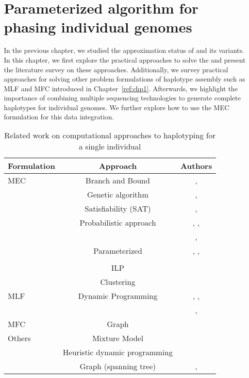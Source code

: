 \chapter{Parameterized algorithm for phasing individual genomes}\label{ref:chp4}
In the previous chapter, we studied the approximation status of \MEC and its variants.
In this chapter, we first explore the practical approaches to solve the \MEC and present the literature survey on these approaches.
Additionally, we survey practical approaches for solving other problem formulations of haplotype assembly such as MLF and MFC introduced in Chapter~\ref{ref:chp1}.
Afterwards, we highlight the importance of combining multiple sequencing technologies to generate complete haplotypes for individual genomes.
We further explore how to use the MEC formulation for this data integration.

\begin{center}
\begin{table}
\centering
\begin{tabular}{ |l|c|c| } 
 \hline
Formulation &  Approach  & Authors \\ 
  \hline
 MEC & Branch and Bound & \cite{wang2005haplotype}, \cite{lim2012individual}\\
   & Genetic algorithm& \cite{wang2005haplotype}, \cite{wang2012using}\\
   & Satisfiability (SAT) & \cite{mousavi2011effective}, \cite{he2010optimal} \\
   & Probabilistic approach & \cite{chen2008linear}, \cite{bansal2008mcmc}, \\
   & & \cite{Bansal2008}, \cite{Kuleshov2014b} \\
   & Parameterized & \cite{deng2013highly}, \cite{Pirola2015}, \\
   & & \cite{Patterson2015}\\
   & ILP & \cite{CDW13_exact} \\
   & Clustering & \cite{wang2007clustering} \\
   \hline
   MLF & Dynamic Programming & \cite{zhao2005haplotype}, \cite{xie2008model}, \\
   & & \cite{kang2010hapassembler}, \cite{wu2013heuristic}\\
   \hline
   MFC & Graph & \cite{Duitama2010} \\
   \hline
   Others & Mixture Model & \cite{matsumoto2013mixsih} \\
    & Heuristic dynamic programming & \cite{xie2012fast} \\
    & Graph (spanning tree) & \cite{aguiar2012hapcompass}, \cite{mazrouee2014fasthap} \\
 \hline
\end{tabular}
\\[10pt]
 \caption{ Related work on computational approaches to haplotyping for a single individual}
\label{tab:related_work}
\end{table}
\end{center}

